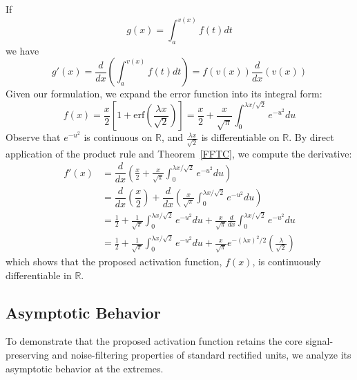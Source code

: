 \documentclass[11pt]{article}
\begin{document}
\noindent If
$$
g(x) = \displaystyle\int_{a}^{v(x)} f(t)dt
$$
we have
$$
g'(x) = \dfrac{d}{dx}\left(  \displaystyle\int_{a}^{v(x)} f(t)dt\right) = f(v(x))\dfrac{d}{dx}(v(x))
$$
\noindent Given our formulation, we expand the error function into its integral form:
\begin{equation*}
f(x) = \frac{x}{2} \left[ 1 + \text{erf}\left( \frac{\lambda x}{\sqrt{2}}\right)\right] = \frac{x}{2} + \frac{x}{\sqrt{\pi}}\int_{0}^{\lambda x / \sqrt{2}} e^{-u^{2}}du
\end{equation*}
Observe that $e^{-u^{2}}$ is continuous on $\mathbb{R}$, and $\frac{\lambda x}{\sqrt{2}}$ is differentiable on $\mathbb{R}$. By direct application of the product rule and Theorem~\ref{FFTC}, we compute the derivative:
\begin{align*}
f'(x) &= \dfrac{d}{dx}\left( \frac{x}{2} + \frac{x}{\sqrt{\pi}}\int_{0}^{\lambda x / \sqrt{2}} e^{-u^{2}}du\right)\\ 
&= \dfrac{d}{dx}\left( \dfrac{x}{2}\right) + \dfrac{d}{dx} \left(  \frac{x}{\sqrt{\pi}}\int_{0}^{\lambda x / \sqrt{2}} e^{-u^{2}}du \right)\\
&=   \frac{1}{2} + \frac{1}{\sqrt{\pi}}\int_{0}^{\lambda x / \sqrt{2}} e^{-u^{2}}du + \frac{x}{\sqrt{\pi}}\frac{d}{dx}\int_{0}^{\lambda x / \sqrt{2}} e^{-u^{2}}du \\
&=   \frac{1}{2} + \frac{1}{\sqrt{\pi}}\int_{0}^{\lambda x / \sqrt{2}} e^{-u^{2}}du + \frac{x}{\sqrt{\pi}}e^{-(\lambda x)^{2} / 2}\left(\frac{\lambda}{\sqrt{2}}\right)
\end{align*}
\noindent which shows that the proposed activation function, $f(x)$, is continuously differentiable in $\mathbb{R}$.
\subsection{Asymptotic Behavior}
\noindent To demonstrate that the proposed activation function retains the core signal-preserving and noise-filtering properties of standard rectified units, we analyze its asymptotic behavior at the extremes.\\ 
\end{document}
